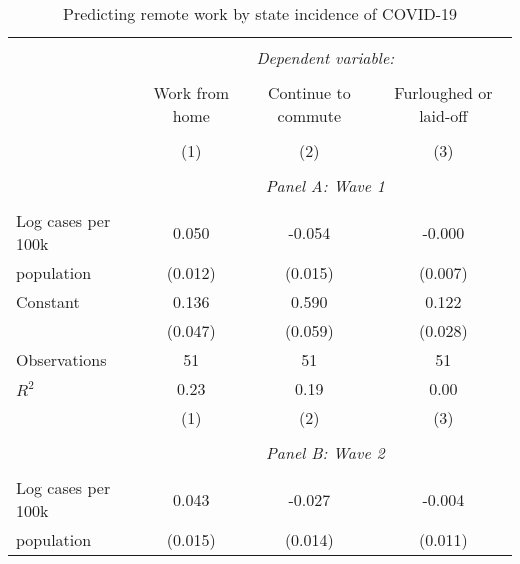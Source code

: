 \begin{table}[!htbp] \centering                    \caption{Predicting remote work by state incidence of COVID-19}                    \label{tab:remotework}                  \small                  \begin{tabular}{@{\extracolsep{5pt}}lccc}                  \\[-1.8ex]\hline                  \hline \\[-1.8ex]                   & \multicolumn{3}{c}{\textit{Dependent variable:}} \\                   \cline{2-4}                   \\[-1.8ex] & Work from home & Continue to commute & Furloughed or laid-off \\                   \hline \\[-1.8ex]               
                    &\multicolumn{1}{c}{(1)}         &\multicolumn{1}{c}{(2)}         &\multicolumn{1}{c}{(3)}         \\
\hline \\               & \multicolumn{3}{c}{\textit{Panel A: Wave 1}} \\               \addlinespace[1mm] \\
Log cases per 100k  &       0.050\sym{***}&      -0.054\sym{***}&      -0.000         \\
population          &     (0.012)         &     (0.015)         &     (0.007)         \\
[1em]
Constant            &       0.136\sym{***}&       0.590\sym{***}&       0.122\sym{***}\\
                    &     (0.047)         &     (0.059)         &     (0.028)         \\
[1em]
Observations        &          51         &          51         &          51         \\
\(R^{2}\)           &        0.23         &        0.19         &        0.00         \\
                    &\multicolumn{1}{c}{(1)}         &\multicolumn{1}{c}{(2)}         &\multicolumn{1}{c}{(3)}         \\
\hline \\               & \multicolumn{3}{c}{\textit{Panel B: Wave 2}} \\               \addlinespace[1mm] \\
Log cases per 100k  &       0.043\sym{***}&      -0.027\sym{*}  &      -0.004         \\
population          &     (0.015)         &     (0.014)         &     (0.011)         \\

\end{tabular}
\end{table}
